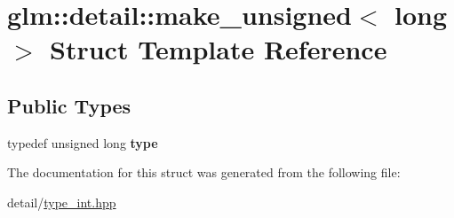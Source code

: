 \hypertarget{structglm_1_1detail_1_1make__unsigned_3_01long_01_4}{\section{glm\-:\-:detail\-:\-:make\-\_\-unsigned$<$ long $>$ Struct Template Reference}
\label{structglm_1_1detail_1_1make__unsigned_3_01long_01_4}
}
\subsection*{Public Types}
\begin{DoxyCompactItemize}
\item 
\hypertarget{structglm_1_1detail_1_1make__unsigned_3_01long_01_4_ade0cc74f63e30969e7d7b42eb6ac8289}{typedef unsigned long {\bfseries type}}\label{structglm_1_1detail_1_1make__unsigned_3_01long_01_4_ade0cc74f63e30969e7d7b42eb6ac8289}

\end{DoxyCompactItemize}


The documentation for this struct was generated from the following file\-:\begin{DoxyCompactItemize}
\item 
detail/\hyperlink{type__int_8hpp}{type\-\_\-int.\-hpp}\end{DoxyCompactItemize}
